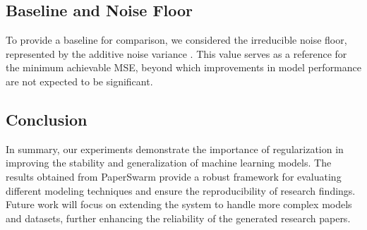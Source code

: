 \subsection{Baseline and Noise Floor}

To provide a baseline for comparison, we considered the irreducible noise floor, represented by the additive noise variance . This value serves as a reference for the minimum achievable MSE, beyond which improvements in model performance are not expected to be significant.

\subsection{Conclusion}

In summary, our experiments demonstrate the importance of regularization in improving the stability and generalization of machine learning models. The results obtained from PaperSwarm provide a robust framework for evaluating different modeling techniques and ensure the reproducibility of research findings. Future work will focus on extending the system to handle more complex models and datasets, further enhancing the reliability of the generated research papers.

